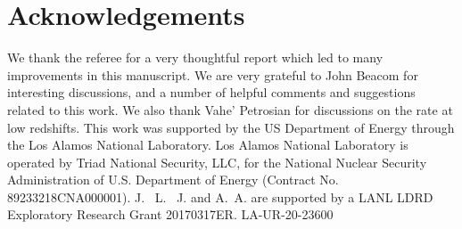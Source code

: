 \documentclass[fleqn,usenatbib,useAMS]{mnras}
\begin{document}


 
 


\section{Acknowledgements}
  We thank the referee for a very thoughtful report which led to many improvements in this manuscript.  We are very grateful to John Beacom for interesting discussions, and a number of helpful comments and suggestions related to this work.  We also thank Vahe' Petrosian for discussions on the rate at low redshifts.  This work was supported by the US Department of Energy through the Los Alamos National Laboratory.  Los Alamos National Laboratory is operated by Triad National Security, LLC, for the National Nuclear Security Administration of U.S. Department of Energy (Contract No. 89233218CNA000001). J. ~L. ~J. and A.~A. are  supported  by  a  LANL  LDRD Exploratory  Research  Grant  20170317ER.  LA-UR-20-23600
  
\end{document}
